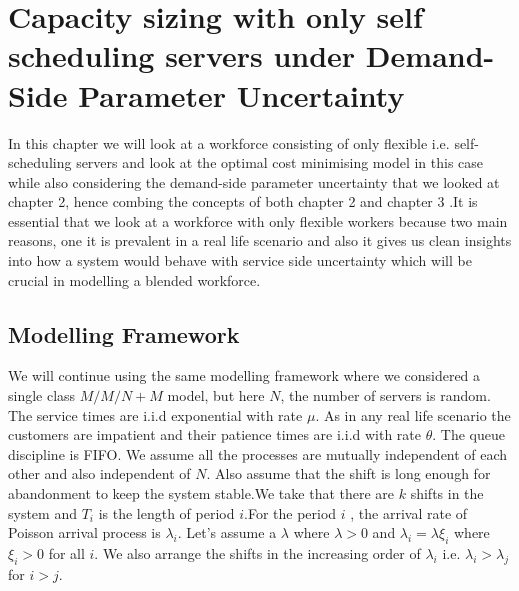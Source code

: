 \chapter{Capacity sizing with only self scheduling servers under Demand-Side Parameter Uncertainty}
In this chapter we will look at a workforce consisting of only flexible i.e. self-scheduling servers and look at the optimal cost minimising model in this case while also considering the demand-side parameter uncertainty that we looked at chapter 2, hence combing the concepts of both chapter 2 and chapter 3 .It is essential that we look at a workforce with only flexible workers because two main reasons, one it is prevalent in a real life scenario and also it gives us clean insights into  how a system would behave with service side uncertainty which will be crucial in modelling a blended workforce.
\section{Modelling Framework}
We will continue using the same modelling framework where we considered a single class $M/M/N +M$ model, but here $N$, the number of servers is random. The service times are i.i.d exponential with rate $\mu$. As in any real life scenario the customers are impatient and their patience times are i.i.d with rate $\theta$. The queue discipline is FIFO. We assume all the processes are mutually independent of each other and also independent of $N$. Also assume that the shift is long enough for abandonment to keep the system stable.We take that there are $k$ shifts in the system and $T_i$ is the length of period $i$.For the period $i$ , the arrival rate of Poisson arrival process is $\lambda_i$. Let's assume a $\lambda$ where $\lambda>0$ and $\lambda_i=\lambda \xi_i$ where $\xi_i >0$ for all $i$. We also arrange the shifts in the increasing order of $\lambda_i$ i.e. $ \lambda_i >\lambda_j$ for $i>j$. 

